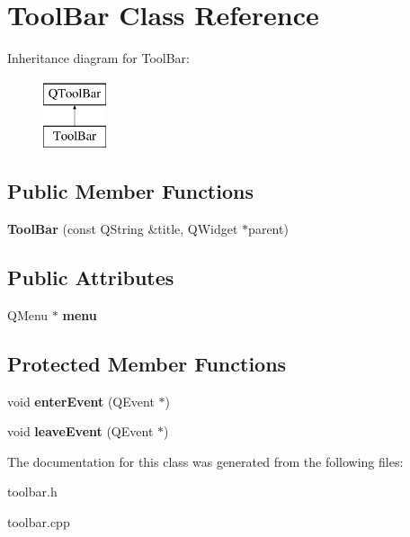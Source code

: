 \hypertarget{class_tool_bar}{\section{Tool\-Bar Class Reference}
\label{class_tool_bar}
}
Inheritance diagram for Tool\-Bar\-:\begin{figure}[H]
\begin{center}
\leavevmode
\includegraphics[height=2.000000cm]{class_tool_bar}
\end{center}
\end{figure}
\subsection*{Public Member Functions}
\begin{DoxyCompactItemize}
\item 
\hypertarget{class_tool_bar_a8cc37599b68c6b40d508ffb6b37ebcac}{{\bfseries Tool\-Bar} (const Q\-String \&title, Q\-Widget $\ast$parent)}\label{class_tool_bar_a8cc37599b68c6b40d508ffb6b37ebcac}

\end{DoxyCompactItemize}
\subsection*{Public Attributes}
\begin{DoxyCompactItemize}
\item 
\hypertarget{class_tool_bar_a41a552950d88c7ddf220ec9443ca7555}{Q\-Menu $\ast$ {\bfseries menu}}\label{class_tool_bar_a41a552950d88c7ddf220ec9443ca7555}

\end{DoxyCompactItemize}
\subsection*{Protected Member Functions}
\begin{DoxyCompactItemize}
\item 
\hypertarget{class_tool_bar_a9f936f5a0e51703c9163c4f4ca43b803}{void {\bfseries enter\-Event} (Q\-Event $\ast$)}\label{class_tool_bar_a9f936f5a0e51703c9163c4f4ca43b803}

\item 
\hypertarget{class_tool_bar_a3a4176e2c929e7d0fdd6431d62e3ae0d}{void {\bfseries leave\-Event} (Q\-Event $\ast$)}\label{class_tool_bar_a3a4176e2c929e7d0fdd6431d62e3ae0d}

\end{DoxyCompactItemize}


The documentation for this class was generated from the following files\-:\begin{DoxyCompactItemize}
\item 
toolbar.\-h\item 
toolbar.\-cpp\end{DoxyCompactItemize}
